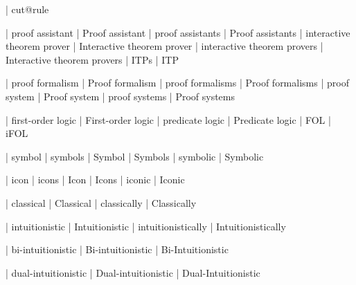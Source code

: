 


 | cut@rule






 | proof assistant
 | Proof assistant
 | proof assistants
 | Proof assistants
 | interactive theorem prover
 | Interactive theorem prover
 | interactive theorem provers
 | Interactive theorem provers
 | ITPs
 | ITP

 | proof formalism
 | Proof formalism
 | proof formalisms
 | Proof formalisms
 | proof system
 | Proof system
 | proof systems
 | Proof systems

 | first-order logic
 | First-order logic
 | predicate logic
 | Predicate logic
 | FOL
 | iFOL

 | symbol
 | symbols
 | Symbol
 | Symbols
 | symbolic
 | Symbolic

 | icon
 | icons
 | Icon
 | Icons
 | iconic
 | Iconic
 
 | classical
 | Classical
 | classically
 | Classically

 | intuitionistic
 | Intuitionistic
 | intuitionistically
 | Intuitionistically

 | bi-intuitionistic
 | Bi-intuitionistic
 | Bi-Intuitionistic

 | dual-intuitionistic
 | Dual-intuitionistic
 | Dual-Intuitionistic

